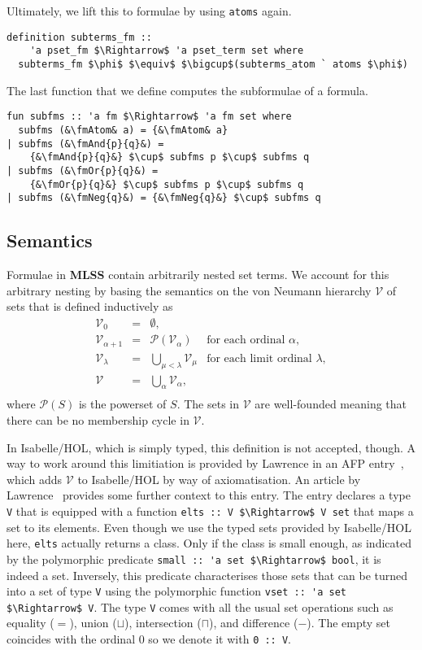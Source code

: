 \documentclass[sigplan,10pt,anonymous,review]{acmart}
\newcommand{\MLSS}{\textbf{MLSS}}
\newcommand{\fmAnd}[2]{#1 $\boldsymbol{\land}$ #2}
\newcommand{\fmOr}[2]{#1 $\boldsymbol{\lor}$ #2}
\newcommand{\fmNeg}[1]{$\boldsymbol{\neg}$ #1}
\newcommand{\fmAtom}{\textbf{A}}
\begin{document}
Ultimately, we lift this to formulae by using \lstinline!atoms! again.
\begin{lstlisting}
definition subterms_fm ::
    'a pset_fm $\Rightarrow$ 'a pset_term set where
  subterms_fm $\phi$ $\equiv$ $\bigcup$(subterms_atom ` atoms $\phi$)
\end{lstlisting}
The last function that we define computes the subformulae of a formula.
\begin{lstlisting}
fun subfms :: 'a fm $\Rightarrow$ 'a fm set where
  subfms (&\fmAtom& a) = {&\fmAtom& a}
| subfms (&\fmAnd{p}{q}&) =
    {&\fmAnd{p}{q}&} $\cup$ subfms p $\cup$ subfms q
| subfms (&\fmOr{p}{q}&) =
    {&\fmOr{p}{q}&} $\cup$ subfms p $\cup$ subfms q
| subfms (&\fmNeg{q}&) = {&\fmNeg{q}&} $\cup$ subfms q
\end{lstlisting}

\subsection{Semantics}
Formulae in \MLSS{} contain arbitrarily nested set terms.
We account for this arbitrary nesting by basing the semantics on the von Neumann hierarchy $\mathcal{V}$ of sets that is defined inductively as
  \[
    \begin{array}{rclr}
      \mathcal{V}_0 & = & \emptyset, \\
      \mathcal{V}_{\alpha + 1} & = & \mathcal{P}(\mathcal{V}_\alpha) & \text{for each ordinal $\alpha$}, \\
      \mathcal{V}_{\lambda} & = & \bigcup_{\mu < \lambda} \mathcal{V}_\mu & \text{for each limit ordinal $\lambda$}, \\
      \mathcal{V} & = & \bigcup_\alpha \mathcal{V}_\alpha, \\
    \end{array}
  \]
where $\mathcal{P}(S)$ is the powerset of $S$.
The sets in $\mathcal{V}$ are well-founded meaning that there can be no membership cycle in $\mathcal{V}$.

In Isabelle/HOL, which is simply typed, this definition is not accepted, though.
A way to work around this limitiation is provided by Lawrence in an AFP entry~\cite{zfc_in_hol_afp}, which adds $\mathcal{V}$ to Isabelle/HOL by way of axiomatisation.
An article by Lawrence~\cite{zfc_in_hol} provides some further context to this entry.
The entry declares a type \lstinline!V! that is equipped with a function \lstinline!elts :: V $\Rightarrow$ V set! that maps a set to its elements.
Even though we use the typed sets provided by Isabelle/HOL here, \lstinline!elts! actually returns a class.
Only if the class is small enough, as indicated by the polymorphic predicate \lstinline!small :: 'a set $\Rightarrow$ bool!, it is indeed a set.
Inversely, this predicate characterises those sets that can be turned into a set of type \lstinline!V! using the polymorphic function \lstinline!vset :: 'a set $\Rightarrow$ V!.
The type \lstinline!V! comes with all the usual set operations such as equality ($=$), union ($\sqcup$), intersection ($\sqcap$), and difference ($-$).
The empty set coincides with the ordinal $0$ so we denote it with \lstinline!0 :: V!.
\end{document}
